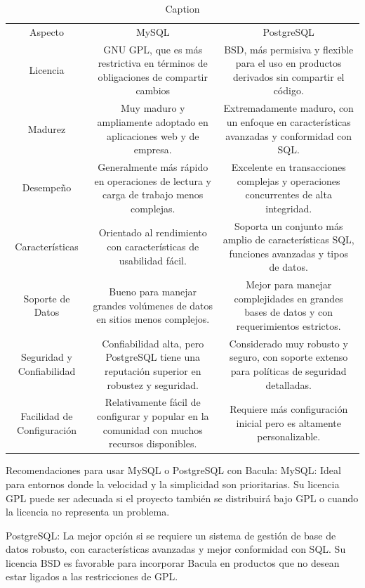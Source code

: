 \begin{table}
    \centering
    \begin{tabular}{ccc}
        Aspecto & MySQL & PostgreSQL\\
        Licencia & GNU GPL, que es más restrictiva en términos de obligaciones de compartir cambios & BSD, más permisiva y flexible para el uso en productos derivados sin compartir el código.\\
        Madurez & Muy maduro y ampliamente adoptado en aplicaciones web y de empresa. & Extremadamente maduro, con un enfoque en características avanzadas y conformidad con SQL.\\
        Desempeño & Generalmente más rápido en operaciones de lectura y carga de trabajo menos complejas. & Excelente en transacciones complejas y operaciones concurrentes de alta integridad.\\
        Características & 	Orientado al rendimiento con características de usabilidad fácil. &Soporta un conjunto más amplio de características SQL, funciones avanzadas y tipos de datos. \\
        Soporte de Datos	& Bueno para manejar grandes volúmenes de datos en sitios menos complejos. & Mejor para manejar complejidades en grandes bases de datos y con requerimientos estrictos. \\
        Seguridad y Confiabilidad & Confiabilidad alta, pero PostgreSQL tiene una reputación superior en robustez y seguridad. & Considerado muy robusto y seguro, con soporte extenso para políticas de seguridad detalladas.\\
        Facilidad de Configuración & Relativamente fácil de configurar y popular en la comunidad con muchos recursos disponibles. & Requiere más configuración inicial pero es altamente personalizable.\\
    \end{tabular}
    \caption{Caption}
\end{table}


Recomendaciones para usar MySQL o PostgreSQL con Bacula:
MySQL: Ideal para entornos donde la velocidad y la simplicidad son prioritarias. Su licencia GPL puede ser adecuada si el proyecto también se distribuirá bajo GPL o cuando la licencia no representa un problema.

PostgreSQL: La mejor opción si se requiere un sistema de gestión de base de datos robusto, con características avanzadas y mejor conformidad con SQL. Su licencia BSD es favorable para incorporar Bacula en productos que no desean estar ligados a las restricciones de GPL.

